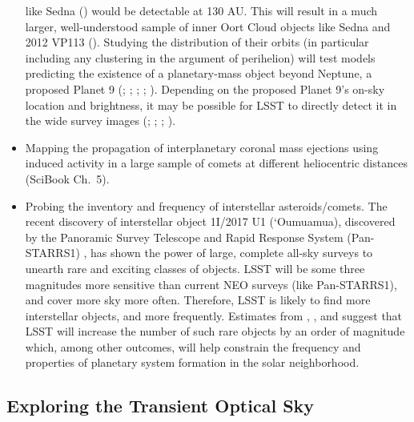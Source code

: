 \begin{itemize}
like Sedna (\cite{2004ApJ...617..645B}) would be detectable at 130 AU. This will result
in a much larger, well-understood sample of inner Oort Cloud objects like Sedna and 2012 VP113
 (\cite{2014Natur.507..471T}).  Studying the distribution of their orbits (in particular including any
clustering in the argument of perihelion) will test models predicting the existence of a planetary-mass object beyond Neptune, a proposed Planet 9 (\cite{2014Natur.507..471T};  \cite{2016AJ....151...22B}; \cite{2016ApJ...824L..23B}; \cite{2016AJ....152..221S}; \cite{2017AJ....154...65B}). Depending on the proposed Planet 9's on-sky location and brightness, it may be possible for LSST to directly detect it in the wide survey images (\cite{2016AJ....151...22B}; \cite{2016ApJ...824L..23B}; \cite{2016AJ....152..221S}; \cite{2017AJ....154...65B}).

\item Mapping the propagation of interplanetary coronal mass ejections using induced
 activity in a large sample of comets at different heliocentric distances
(SciBook Ch.~5).
\item Probing the inventory and frequency of  interstellar asteroids/comets. The recent discovery of interstellar object
1I/2017 U1 (`Oumuamua), discovered by the Panoramic Survey Telescope and Rapid Response System (Pan-STARRS1) \citep{2017MPEC....U..181B}, has shown the power  of large, complete all-sky surveys to unearth
rare and exciting classes of objects. LSST will be some three magnitudes more sensitive
than  current NEO surveys (like Pan-STARRS1), and cover more sky more
often. Therefore, LSST is likely to find more interstellar objects, and more frequently.
Estimates from  \cite{2016ApJ...825...51C},  \cite{2017AJ....153..133E}, and \cite{2017ApJ...850L..38T} suggest that LSST will increase the number of  such rare objects by an order of magnitude which, among other outcomes, will help
constrain the frequency and properties of planetary system formation in the solar neighborhood.
\end{itemize}


\subsection{ Exploring the Transient Optical Sky }




